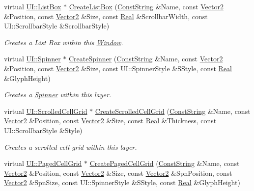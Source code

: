 \begin{DoxyCompactItemize}
virtual \hyperlink{classphys_1_1UI_1_1ListBox}{UI::ListBox} $\ast$ \hyperlink{classphys_1_1UI_1_1Window_a76ed1da40da3a0c2a4846bf145684569}{CreateListBox} (\hyperlink{namespacephys_a5ce5049f8b4bf88d6413c47b504ebb31}{ConstString} \&Name, const \hyperlink{classphys_1_1Vector2}{Vector2} \&Position, const \hyperlink{classphys_1_1Vector2}{Vector2} \&Size, const \hyperlink{namespacephys_af7eb897198d265b8e868f45240230d5f}{Real} \&ScrollbarWidth, const UI::ScrollbarStyle \&ScrollbarStyle)
\begin{DoxyCompactList}\small\item\em Creates a List Box within this \hyperlink{classphys_1_1UI_1_1Window}{Window}. \item\end{DoxyCompactList}\item 
virtual \hyperlink{classphys_1_1UI_1_1Spinner}{UI::Spinner} $\ast$ \hyperlink{classphys_1_1UI_1_1Window_ad2a3cdcc8cbbf74b08a3c9173ef3334d}{CreateSpinner} (\hyperlink{namespacephys_a5ce5049f8b4bf88d6413c47b504ebb31}{ConstString} \&Name, const \hyperlink{classphys_1_1Vector2}{Vector2} \&Position, const \hyperlink{classphys_1_1Vector2}{Vector2} \&Size, const UI::SpinnerStyle \&SStyle, const \hyperlink{namespacephys_af7eb897198d265b8e868f45240230d5f}{Real} \&GlyphHeight)
\begin{DoxyCompactList}\small\item\em Creates a \hyperlink{classphys_1_1UI_1_1Spinner}{Spinner} within this layer. \item\end{DoxyCompactList}\item 
virtual \hyperlink{classphys_1_1UI_1_1ScrolledCellGrid}{UI::ScrolledCellGrid} $\ast$ \hyperlink{classphys_1_1UI_1_1Window_a1b18e4a606926b140b8d9cb8b4591c2f}{CreateScrolledCellGrid} (\hyperlink{namespacephys_a5ce5049f8b4bf88d6413c47b504ebb31}{ConstString} \&Name, const \hyperlink{classphys_1_1Vector2}{Vector2} \&Position, const \hyperlink{classphys_1_1Vector2}{Vector2} \&Size, const \hyperlink{namespacephys_af7eb897198d265b8e868f45240230d5f}{Real} \&Thickness, const UI::ScrollbarStyle \&Style)
\begin{DoxyCompactList}\small\item\em Creates a scrolled cell grid within this layer. \item\end{DoxyCompactList}\item 
virtual \hyperlink{classphys_1_1UI_1_1PagedCellGrid}{UI::PagedCellGrid} $\ast$ \hyperlink{classphys_1_1UI_1_1Window_a603ced583f51d345c3f5d775c292fdd1}{CreatePagedCellGrid} (\hyperlink{namespacephys_a5ce5049f8b4bf88d6413c47b504ebb31}{ConstString} \&Name, const \hyperlink{classphys_1_1Vector2}{Vector2} \&Position, const \hyperlink{classphys_1_1Vector2}{Vector2} \&Size, const \hyperlink{classphys_1_1Vector2}{Vector2} \&SpnPosition, const \hyperlink{classphys_1_1Vector2}{Vector2} \&SpnSize, const UI::SpinnerStyle \&SStyle, const \hyperlink{namespacephys_af7eb897198d265b8e868f45240230d5f}{Real} \&GlyphHeight)

\end{DoxyCompactItemize}
